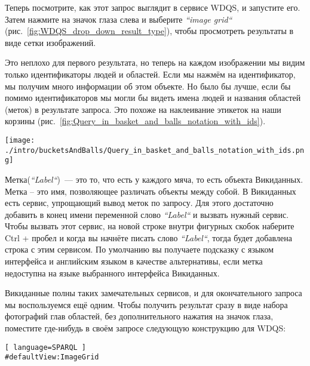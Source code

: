 \newpage Теперь посмотрите, как этот запрос выглядит в сервисе WDQS, и запустите его. Затем нажмите на значок глаза слева и выберите \textit{``image grid``} (рис.~\ref{fig:WDQS_drop_down_result_type}), чтобы просмотреть результаты в виде сетки изображений.

\begin{marginfigure}
	{
		\setlength{\fboxsep}{0pt}%
		\setlength{\fboxrule}{1pt}%
	}
    \caption{Выбор отображения результатов в виде \textit{``image grid``} (сетки изображений).}
	\label{fig:WDQS_drop_down_result_type}
\end{marginfigure}

Это неплохо для первого результата, но теперь на каждом изображении мы видим только идентификаторы людей и областей. Если мы нажмём на идентификатор, мы получим много информации об этом объекте. Но было бы лучше, если бы помимо идентификаторов мы могли бы видеть имена людей и названия областей (меток) в результате запроса. Это похоже на наклеивание этикеток на наши корзины (рис.~\ref{fig:Query_in_basket_and_balls_notation_with_ids}).

\begin{figure*}[h!]
\texttt{[image: ./intro/bucketsAndBalls/Query\_in\_basket\_and\_balls\_notation\_with\_ids.png]}
\caption{Запрос в нотации <<Корзины и мячи с номерами свойств и объектов Викиданных>>.}
\label{fig:Query_in_basket_and_balls_notation_with_ids}
\end{figure*}

Метка(\textit{``Label``})~--- это то, что есть у каждого мяча, то есть объекта Викиданных. Метка – это имя, позволяющее различать объекты между собой. В Викиданных есть сервис, упрощающий вывод меток по запросу. Для этого достаточно добавить в конец имени переменной слово \textit{``Label``} и вызвать нужный сервис. Чтобы вызвать этот сервис, на новой строке внутри фигурных скобок наберите Ctrl + пробел и когда вы начнёте писать слово \textit{``Label``}, тогда будет добавлена строка с этим сервисом. По умолчанию вы получаете подсказку с языком интерфейса и английским языком в качестве альтернативы, если метка недоступна на языке выбранного интерфейса Викиданных.

Викиданные полны таких замечательных сервисов, и для окончательного запроса мы воспользуемся ещё одним. Чтобы получить результат сразу в виде набора фотографий глав областей, без дополнительного нажатия на значок глаза, поместите где-нибудь в своём запросе следующую конструкцию для WDQS:
\begin{lstlisting}[ language=SPARQL ]
#defaultView:ImageGrid
\end{lstlisting}

